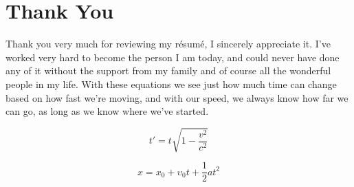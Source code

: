 \documentclass[12pt,a4paper,sans]{moderncv}        %
\begin{document}
\section{Thank You}

\vspace{6pt}

\textnormal{Thank you very much for reviewing my résumé, I sincerely appreciate it. I've worked very hard to become the person I am today, and could never have done any of it without the support from my family and of course all the wonderful people in my life. 
With these equations we see just how much time can change based on how fast we're moving, and with our speed, we always know how far we can go, as long as we know where we've started.}

$$t' = t \sqrt{1 - \frac{v^2}{c^2}} $$

$$x = x_0 + \upsilon _0 t +  \frac{1}{2} at^2 $$

\nocite{*}

         
\end{document}
